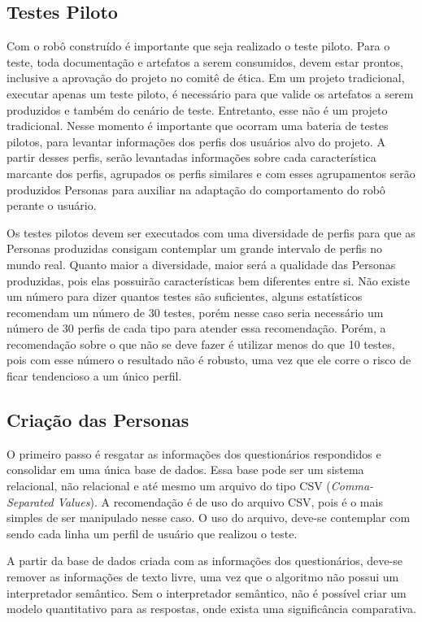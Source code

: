 \subsection{Testes Piloto}
\label{sec:testepiloto}
Com o robô construído é importante que seja realizado o teste piloto. Para o teste, toda documentação e artefatos a serem consumidos, devem estar prontos, inclusive a aprovação do projeto no comitê de ética. Em um projeto tradicional, executar apenas um teste piloto, é necessário para que valide os artefatos a serem produzidos e também do cenário de teste. Entretanto, esse não é um projeto tradicional. Nesse momento é importante que ocorram uma bateria de testes pilotos, para levantar informações dos perfis dos usuários alvo do projeto. A partir desses perfis, serão levantadas informações sobre cada característica marcante dos perfis, agrupados os perfis similares e com esses agrupamentos serão produzidos Personas para auxiliar na adaptação do comportamento do robô perante o usuário.

Os testes pilotos devem ser executados com uma diversidade de perfis para que as Personas produzidas consigam contemplar um grande intervalo de perfis no mundo real. Quanto maior a diversidade, maior será a qualidade das Personas produzidas, pois elas possuirão características bem diferentes entre si. Não existe um número para dizer quantos testes são suficientes, alguns estatísticos recomendam um número de 30 testes, porém nesse caso seria necessário um número de 30 perfis de cada tipo para atender essa recomendação. Porém, a recomendação sobre o que não se deve fazer é utilizar menos do que 10 testes, pois com esse número o resultado não é robusto, uma vez que ele corre o risco de ficar tendencioso a um único perfil.

\subsection{Criação das Personas}
\label{sec:criacaopersonas}
O primeiro passo é resgatar as informações dos questionários respondidos e consolidar em uma única base de dados. Essa base pode ser um sistema relacional, não relacional e até mesmo um arquivo do tipo CSV (\textit{Comma-Separated Values}). A recomendação é de uso do arquivo CSV, pois é o mais simples de ser manipulado nesse caso. O uso do arquivo, deve-se contemplar com sendo cada linha um perfil de usuário que realizou o teste.

A partir da base de dados criada com as informações dos questionários, deve-se remover as informações de texto livre, uma vez que o algoritmo não possui um interpretador semântico. Sem o interpretador semântico, não é possível criar um modelo quantitativo para as respostas, onde exista uma significância comparativa.

